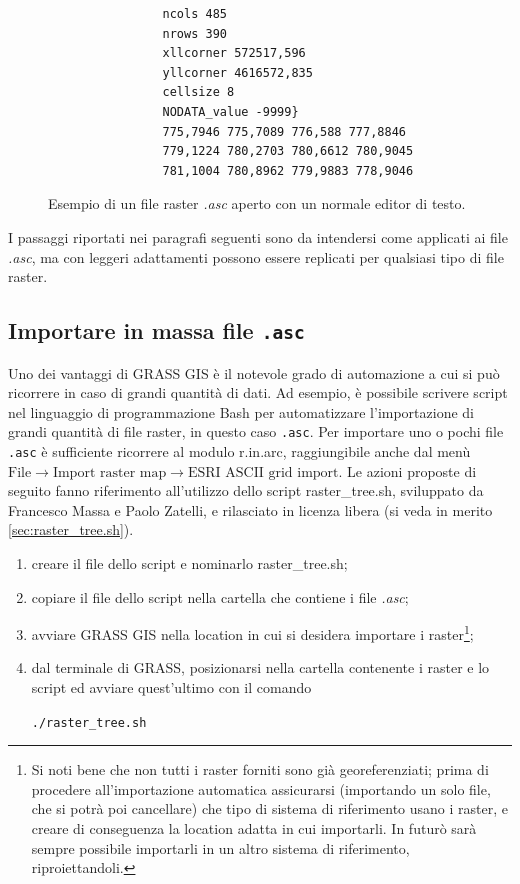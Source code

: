 	\begin{figure}
		\centering
		\begin{minipage}[t]{0.5\columnwidth}
			\begin{verbatim}
				ncols 485
				nrows 390
				xllcorner 572517,596
				yllcorner 4616572,835
				cellsize 8
				NODATA_value -9999}
				775,7946 775,7089 776,588 777,8846
				779,1224 780,2703 780,6612 780,9045
				781,1004 780,8962 779,9883 778,9046
			\end{verbatim}
		\end{minipage}
		\caption{{\small \label{fig:Esempio-asc}Esempio di un file raster }\emph{\small .asc }{\small aperto con un normale editor di testo.}}
	\end{figure}

	I passaggi riportati nei paragrafi seguenti sono da intendersi come applicati ai file \emph{.asc}, ma con leggeri adattamenti possono essere replicati per qualsiasi tipo di file raster.

	\subsection{Importare in massa file \texttt{.asc}}
		Uno dei vantaggi di GRASS GIS è il notevole grado di automazione a cui si può ricorrere in caso di grandi quantità di dati. Ad esempio, è possibile scrivere script nel linguaggio di programmazione Bash per automatizzare l'importazione di grandi quantità di file raster, in questo caso \texttt{.asc}. Per importare uno o pochi file \texttt{.asc} è sufficiente ricorrere al modulo \textsf{r.in.arc}, raggiungibile anche dal menù \textsf{$\text{File}\rightarrow\text{Import~raster~map}\rightarrow\text{ESRI~ASCII~grid~import}$}. Le azioni proposte di seguito fanno riferimento all'utilizzo dello script \textsf{raster\_tree.sh}, sviluppato da Francesco Massa e Paolo Zatelli, e rilasciato in licenza libera (si veda in merito \textsection\ref{sec:raster_tree.sh}).
		
		\begin{enumerate}
			\item creare il file dello script e nominarlo \textsf{raster\_tree.sh};
			\item copiare il file dello script nella cartella che contiene i file \emph{.asc};
			\item avviare GRASS GIS nella location in cui si desidera importare i raster\footnote{Si noti bene che non tutti i raster forniti sono già georeferenziati; prima di procedere all'importazione automatica assicurarsi (importando un solo file, che si potrà poi cancellare) che tipo di sistema di riferimento usano i raster, e creare di conseguenza la location adatta in cui importarli. In futurò sarà sempre possibile importarli in un altro sistema di riferimento, riproiettandoli.};
			\item dal terminale di GRASS, posizionarsi nella cartella contenente i raster e lo script ed avviare quest'ultimo con il comando

			\texttt{./raster\_tree.sh}

		\end{enumerate}
		
